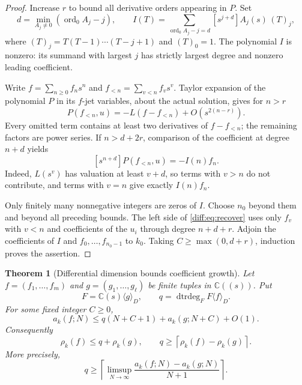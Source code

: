 \documentclass[11pt,a4paper]{article}
\newcommand{\C}{\mathbb C}
\DeclareMathOperator{\dtrdeg}{dtrdeg}
\DeclareMathOperator{\ord}{ord}
\newtheorem{theorem}{Theorem}[section]
\theoremstyle{definition}
\theoremstyle{remark}
\numberwithin{equation}{section}
\begin{document}
\begin{proof}
Increase $r$ to bound all derivative orders appearing in $P$.
Set
\begin{equation}\label{diff:eq:indicial}
 d=\min_{A_j\ne0}(\ord_0 A_j-j),\qquad
 I(T)=\sum_{\ord_0 A_j-j=d}[s^{j+d}]A_j(s)\,(T)_j,
\end{equation}
where $(T)_j=T(T-1)\cdots(T-j+1)$ and $(T)_0=1$.
The polynomial $I$ is nonzero: its summand with largest $j$ has
strictly largest degree and nonzero leading coefficient.

Write $f=\sum_{n\ge0}f_ns^n$ and $f_{<n}=\sum_{v<n}f_vs^v$.
Taylor expansion of the polynomial $P$ in its $f$-jet variables,
about the actual solution, gives for $n>r$
\begin{equation}\label{diff:eq:linearize}
 P(f_{<n},u)=-L(f-f_{<n})+O(s^{2(n-r)}).
\end{equation}
Every omitted term contains at least two derivatives of
$f-f_{<n}$; the remaining factors are power series. If $n>d+2r$,
comparison of the coefficient at degree $n+d$ yields
\begin{equation}\label{diff:eq:recover}
 [s^{n+d}]P(f_{<n},u)=-I(n)f_n.
\end{equation}
Indeed, $L(s^v)$ has valuation at least $v+d$, so terms with $v>n$
do not contribute, and terms with $v=n$ give exactly $I(n)f_n$.

Only finitely many nonnegative integers are zeros of $I$. Choose
$n_0$ beyond them and beyond all preceding bounds. The left side
of \eqref{diff:eq:recover} uses only $f_v$ with $v<n$ and coefficients
of the $u_i$ through degree $n+d+r$. Adjoin the coefficients of
$I$ and $f_0,\ldots,f_{n_0-1}$ to $k_0$. Taking
$C\ge\max(0,d+r)$, induction proves the assertion.
\end{proof}

\begin{theorem}[Differential dimension bounds coefficient growth]
\label{diff:thm:dimension}
Let $f=(f_1,\ldots,f_m)$ and $g=(g_1,\ldots,g_\ell)$ be finite
tuples in $\C((s))$. Put
\[
 F=\C(s)\langle g\rangle_D,
 \qquad q=\dtrdeg_F F\langle f\rangle_D.
\]
For some fixed integer $C\ge0$,
\begin{equation}\label{diff:eq:dimension-bound}
 a_k(f;N)\le q(N+C+1)+a_k(g;N+C)+O(1).
\end{equation}
Consequently
\begin{equation}\label{diff:eq:rate-bound}
 \rho_k(f)\le q+\rho_k(g),\qquad
 q\ge\left\lceil\rho_k(f)-\rho_k(g)\right\rceil.
\end{equation}
More precisely,
\begin{equation}\label{diff:eq:difference-rate}
 q\ge\left\lceil\limsup_{N\to\infty}
       \frac{a_k(f;N)-a_k(g;N)}{N+1}\right\rceil.
\end{equation}
\end{theorem}
\end{document}
